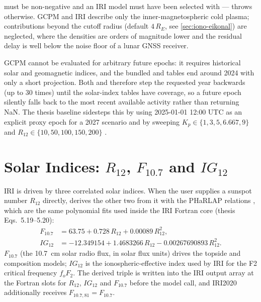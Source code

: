 \begin{lupntnote}
 must be non-negative and an IRI model must have been selected
with  ---  throws otherwise.  GCPM and IRI
describe only the inner-magnetospheric cold plasma; contributions beyond the
cutoff radius (default $4\,R_E$, see \cref{sec:iono-eikonal}) are neglected,
where the densities are orders of magnitude lower and the residual delay is well
below the noise floor of a lunar GNSS receiver.
\end{lupntnote}

\begin{lupntwarning}
GCPM cannot be evaluated for arbitrary future epochs: it requires historical
solar and geomagnetic indices, and the bundled  and
 tables end around 2024 with only a short projection.  Both
 and  therefore step the requested year
backwards (up to 30 times) until the solar-index tables have coverage, so a
future epoch silently falls back to the most recent available activity rather
than returning NaN.  The thesis baseline sidesteps this by using
2025-01-01 12:00 UTC as an explicit proxy epoch for a 2027 scenario and by
sweeping $K_p \in \{1, 3, 5, 6.667, 9\}$ and
$R_{12} \in \{10, 50, 100, 150, 200\}$ \citep[Ch.~5]{iiyama2026thesis}.
\end{lupntwarning}

\section{Solar Indices: \texorpdfstring{$R_{12}$}{R12}, \texorpdfstring{$F_{10.7}$}{F10.7} and \texorpdfstring{$IG_{12}$}{IG12}}
\label{sec:iono-indices}

IRI is driven by three correlated solar indices.  When the user supplies a
sunspot number $R_{12}$ directly, \lupnt{} derives the other two from it with
the PHaRLAP relations \citep{cervera2014pharlap}, which are the same polynomial
fits used inside the IRI Fortran core (thesis Eqs.~5.19--5.20):
%
\begin{align}
  \label{eq:iono-f107}
  F_{10.7} &= 63.75 + 0.728\,R_{12} + \num{0.00089}\,R_{12}^2 , \\
  \label{eq:iono-ig12}
  IG_{12}  &= -12.349154 + 1.4683266\,R_{12} - \num{0.00267690893}\,R_{12}^2 .
\end{align}
%
$F_{10.7}$ (the \SI{10.7}{\centi\meter} solar radio flux, in solar flux units)
drives the topside and composition models; $IG_{12}$ is the
ionospheric-effective index used by IRI for the F2 critical frequency $f_oF_2$.
The derived triple is written into the IRI output array  at the
Fortran slots for $R_{12}$, $IG_{12}$ and $F_{10.7}$ before the model call, and
IRI2020 additionally receives $F_{10.7,81} = F_{10.7}$.

